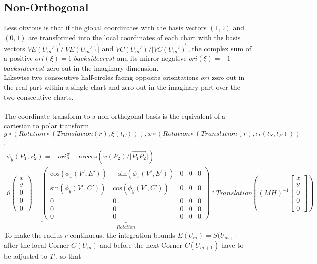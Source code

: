 \documentclass{report}
\begin{document}
\subsection{Non-Orthogonal}
Less obvious is that if the global coordinates with the basis vectors $(1,0)$ and $(0,1)$ are transformed into the local coordinates of each chart with the basis vectors $\overrightarrow{VE(U_{m}')}/\lvert \overrightarrow{VE(U_{m}')}\rvert$ and $\overrightarrow{VC(U_{m}')}/\lvert \overrightarrow{VC(U_{m}')}\rvert$, the complex sum of a positive $ori(\xi)=1$ $backsidecrest$ and its mirror negative $ori(\xi)=-1$ $backsidecrest$ zero out in the imaginary dimension.\\
Likewise two consecutive half-circles facing opposite orientations $ori$ zero out in the real part within a single chart and zero out in the imaginary part over the two consecutive charts.\\\\
The coordinate transform to a non-orthogonal basis is the equivalent of a cartesian to polar transform $y\circ (Rotation\circ (Translation(r),\xi(t_{C}))),x\circ (Rotation\circ (Translation(r),\iota_{T}(t_{S},t_{E})))$.
\begin{align}
\phi_{y}(P_{1},P_{2}) = -ori\frac{\pi}{2}-\mathrm{arccos}(x(P_{2})/\lvert \overrightarrow{P_{1}P_{2}}\rvert)\\
\vartheta
\begin{pmatrix}x \\ y \\ 0 \\ 0 \\ 0\end{pmatrix}=
\underbrace{
\begin{pmatrix}
\mathrm{cos}(\phi_{x}(V',E')) & -\mathrm{sin}(\phi_{x}(V',E')) & 0 & 0 & 0 \\
\mathrm{sin}(\phi_{y}(V',C')) & \mathrm{cos}(\phi_{y}(V',C')) & 0 & 0 & 0 \\
0 & 0 & 0 & 0 & 0 \\
0 & 0 & 0 & 0 & 0 \\
0 & 0 & 0 & 0 & 0
\end{pmatrix}
}_{Rotation}*
Translation((MH)^{-1}\begin{bmatrix} x \\ y \\ 0 \\ 0 \\ 0 \end{bmatrix})
\end{align}
To make the radius $r$ continuous, the integration bounds $E(U_{m})=S(U_{m+1}$ after the local Corner $C(U_{m})$ and before the next Corner $C(U_{m+1})$ have to be adjusted to $T'$, so that
\end{document}
